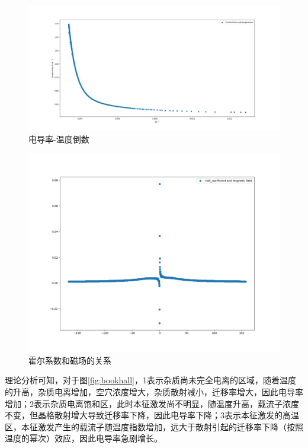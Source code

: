\documentclass{buaaemp}
\begin{document}
\begin{figure}
    \centering
    \includegraphics[width=\linewidth]{image/Conductivity.png}
    \caption{电导率-温度倒数}
    \label{fig:Conductivity}
\end{figure}

\begin{figure}
    \centering
    \includegraphics[width=\linewidth]{image/Hall_coefficient_B.png}
    \caption{霍尔系数和磁场的关系}
    \label{fig:Hall_B}
\end{figure}
	理论分析可知，对于图\ref{fig:bookhall}，1表示杂质尚未完全电离的区域，随着温度的升高，杂质电离增加，空穴浓度增大，杂质散射减小，迁移率增大，因此电导率增加；2表示杂质电离饱和区，此时本征激发尚不明显，随温度升高，载流子浓度不变，但晶格散射增大导致迁移率下降，因此电导率下降；3表示本征激发的高温区，本征激发产生的载流子随温度指数增加，远大于散射引起的迁移率下降（按照温度的幂次）效应，因此电导率急剧增长。
	
\end{document}
